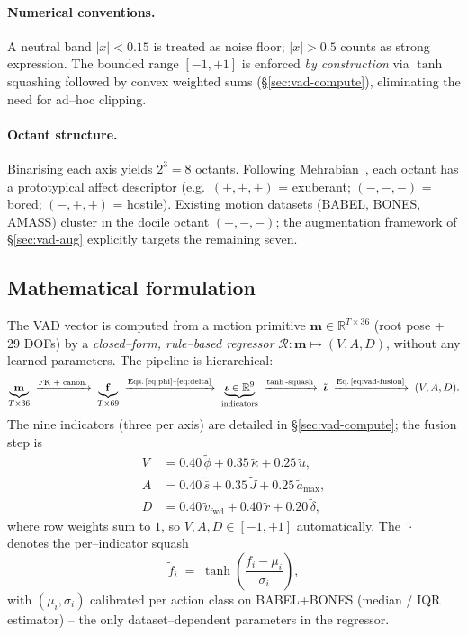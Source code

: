 \paragraph{Numerical conventions.}
A neutral band $|x|<0.15$ is treated as noise floor; $|x|>0.5$ counts as
strong expression. The bounded range $[-1,+1]$ is enforced \emph{by
construction} via $\tanh$ squashing followed by convex weighted sums
(\S\ref{sec:vad-compute}), eliminating the need for ad--hoc clipping.

\paragraph{Octant structure.}
Binarising each axis yields $2^3=8$ octants. Following
Mehrabian~\cite{mehrabian1996pad}, each octant has a prototypical affect
descriptor (e.g.\ $(+,+,+)$ = exuberant; $(-,-,-)$ = bored;
$(-,+,+)$ = hostile). Existing motion datasets (BABEL, BONES, AMASS)
cluster in the docile octant $(+,-,-)$; the augmentation framework of
\S\ref{sec:vad-aug} explicitly targets the remaining seven.

\subsection{Mathematical formulation}
\label{sec:vad-math}

The VAD vector is computed from a motion primitive
$\mathbf{m}\in\mathbb{R}^{T\times 36}$ (root pose + 29 DOFs) by a
\emph{closed--form, rule--based regressor} $\mathcal{R}: \mathbf{m}\!\mapsto\!
(V,A,D)$, without any learned parameters. The pipeline is hierarchical:
\begin{equation}
  \underbrace{\mathbf{m}}_{T\times 36}\;\xrightarrow{\text{FK + canon.}}\;
  \underbrace{\mathbf{f}}_{T\times 69}\;\xrightarrow{\text{Eqs.\,\ref{eq:phi}--\ref{eq:delta}}}\;
  \underbrace{\boldsymbol{\iota}\in\mathbb{R}^{9}}_{\text{indicators}}\;\xrightarrow{\tanh\text{-squash}}\;
  \tilde{\boldsymbol{\iota}}\;\xrightarrow{\text{Eq.\,\ref{eq:vad-fusion}}}\;
  (V,A,D).
  \label{eq:pipeline}
\end{equation}
The nine indicators (three per axis) are detailed in
\S\ref{sec:vad-compute}; the fusion step is
\begin{equation}
  \boxed{\;
  \begin{aligned}
    V &= 0.40\,\tilde{\phi} + 0.35\,\tilde{\kappa} + 0.25\,\tilde{u},\\[2pt]
    A &= 0.40\,\tilde{\bar s} + 0.35\,\tilde{J} + 0.25\,\tilde{a}_{\max},\\[2pt]
    D &= 0.40\,\tilde{v}_{\text{fwd}} + 0.40\,\tilde{r} + 0.20\,\tilde{\delta},
  \end{aligned}\;}
  \label{eq:vad-fusion}
\end{equation}
where row weights sum to $1$, so $V,A,D\in[-1,+1]$ automatically. The
$\tilde{\,\cdot\,}$ denotes the per--indicator squash
\begin{equation}
  \tilde{f}_i \;=\; \tanh\!\left(\frac{f_i - \mu_i}{\sigma_i}\right),
  \label{eq:tanh-squash}
\end{equation}
with $(\mu_i,\sigma_i)$ calibrated per action class on BABEL+BONES
(median / IQR estimator) -- the only dataset--dependent parameters in the
regressor.

